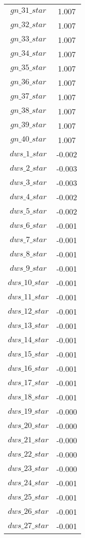 \begin{center}
\begin{longtable}{cc}
$gn\_31\_star$ 	 & 	 1.007 \\
$gn\_32\_star$ 	 & 	 1.007 \\
$gn\_33\_star$ 	 & 	 1.007 \\
$gn\_34\_star$ 	 & 	 1.007 \\
$gn\_35\_star$ 	 & 	 1.007 \\
$gn\_36\_star$ 	 & 	 1.007 \\
$gn\_37\_star$ 	 & 	 1.007 \\
$gn\_38\_star$ 	 & 	 1.007 \\
$gn\_39\_star$ 	 & 	 1.007 \\
$gn\_40\_star$ 	 & 	 1.007 \\
$dws\_1\_star$ 	 & 	 -0.002 \\
$dws\_2\_star$ 	 & 	 -0.003 \\
$dws\_3\_star$ 	 & 	 -0.003 \\
$dws\_4\_star$ 	 & 	 -0.002 \\
$dws\_5\_star$ 	 & 	 -0.002 \\
$dws\_6\_star$ 	 & 	 -0.001 \\
$dws\_7\_star$ 	 & 	 -0.001 \\
$dws\_8\_star$ 	 & 	 -0.001 \\
$dws\_9\_star$ 	 & 	 -0.001 \\
$dws\_10\_star$ 	 & 	 -0.001 \\
$dws\_11\_star$ 	 & 	 -0.001 \\
$dws\_12\_star$ 	 & 	 -0.001 \\
$dws\_13\_star$ 	 & 	 -0.001 \\
$dws\_14\_star$ 	 & 	 -0.001 \\
$dws\_15\_star$ 	 & 	 -0.001 \\
$dws\_16\_star$ 	 & 	 -0.001 \\
$dws\_17\_star$ 	 & 	 -0.001 \\
$dws\_18\_star$ 	 & 	 -0.001 \\
$dws\_19\_star$ 	 & 	 -0.000 \\
$dws\_20\_star$ 	 & 	 -0.000 \\
$dws\_21\_star$ 	 & 	 -0.000 \\
$dws\_22\_star$ 	 & 	 -0.000 \\
$dws\_23\_star$ 	 & 	 -0.000 \\
$dws\_24\_star$ 	 & 	 -0.001 \\
$dws\_25\_star$ 	 & 	 -0.001 \\
$dws\_26\_star$ 	 & 	 -0.001 \\
$dws\_27\_star$ 	 & 	 -0.001 \\

\end{longtable}
\end{center}
